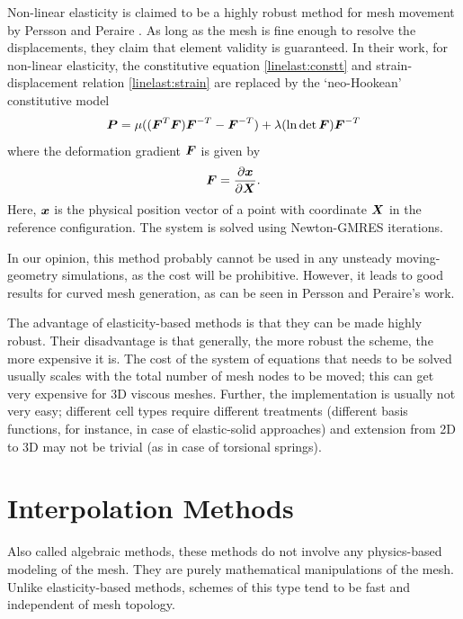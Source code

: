  Non-linear elasticity is claimed to be a highly robust method for mesh movement by Persson and Peraire \cite{curve:persson}. As long as the mesh is fine enough to resolve the displacements, they claim that element validity is guaranteed. In their work, for non-linear elasticity, the constitutive equation \eqref{linelast:constt} and strain-displacement relation \eqref{linelast:strain} are replaced by the `neo-Hookean' constitutive model
 \begin{equation}
 \boldsymbol{P} = \mu ((\boldsymbol{F}^T\boldsymbol{F})\boldsymbol{F}^{-T} - \boldsymbol{F}^{-T}) + \lambda(\ln \det\boldsymbol{F})\boldsymbol{F}^{-T}
 \end{equation}
 where the deformation gradient $\boldsymbol{F}$ is given by
 \[
 \boldsymbol{F} = \frac{\partial\boldsymbol{x}}{\partial\boldsymbol{X}}.
 \]
 Here, $\boldsymbol{x}$ is the physical position vector of a point with coordinate $\boldsymbol{X}$ in the reference configuration. The system is solved using Newton-GMRES iterations.
 
 In our opinion, this method probably cannot be used in any unsteady moving-geometry simulations, as the cost will be prohibitive. However, it leads to good results for curved mesh generation, as can be seen in Persson and Peraire's work.
 
 The advantage of elasticity-based methods is that they can be made highly robust. Their disadvantage is that generally, the more robust the scheme, the more expensive it is. The cost of the system of equations that needs to be solved usually scales with the total number of mesh nodes to be moved; this can get very expensive for 3D viscous meshes. Further, the implementation is usually not very easy; different cell types require different treatments (different basis functions, for instance, in case of elastic-solid approaches) and extension from 2D to 3D may not be trivial (as in case of torsional springs).
 
 \section{Interpolation  Methods}
 Also called algebraic methods, these methods do not involve any physics-based modeling of the mesh. They are purely mathematical manipulations of the mesh. Unlike elasticity-based methods, schemes of this type tend to be fast and independent of mesh topology. 
 
